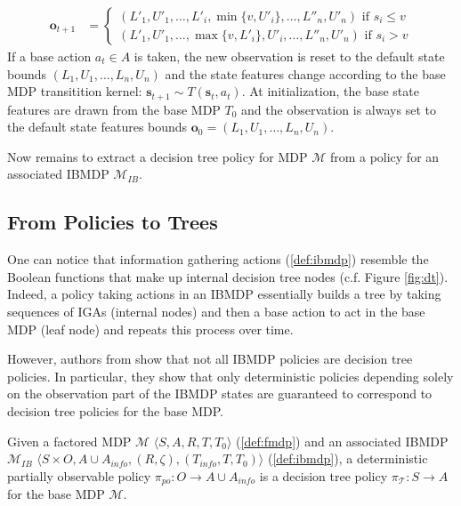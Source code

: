 \begin{definition}
\begin{itemize}
\begin{align*}
    \boldsymbol{o}_{t+1} &= \begin{cases}
        (L'_1, U'_1, \dots , L'_i, \min\{v, U'_i\}, \dots , L''_n, U'_n) \text{ if } s_i \leq v\\
        (L'_1, U'_1, \dots , \max\{v, L'_i\}, U'_i, \dots , L''_n, U'_n) \text{ if } s_i > v
    \end{cases}
\end{align*}
If a base action $a_t\in A$ is taken, the new observation is reset to the default state bounds $(L_1, U_1,\dots, L_n, U_n)$ and the state features change according to the base MDP transitition kernel: $\boldsymbol{s}_{t+1}\sim T(\boldsymbol{s}_t, a_t)$.
At initialization, the base state features are drawn from the base MDP $T_0$ and the observation is always set to the default state features bounds $\boldsymbol{o}_0=(L_1, U_1,\dots, L_n, U_n)$.
\end{itemize}
\end{definition}

Now remains to extract a decision tree policy for MDP $\mathcal{M}$ from a policy for an associated IBMDP $\mathcal{M}_{IB}$. 

\subsection{From Policies to Trees}

One can notice that information gathering actions (\ref{def:ibmdp}) resemble the Boolean functions that make up internal decision tree nodes (c.f. Figure \ref{fig:dt}).
Indeed, a policy taking actions in an IBMDP essentially builds a tree by taking sequences of IGAs (internal nodes) and then a base action to act in the base MDP (leaf node) and repeats this process over time.

However, authors from \cite{topin2021iterative} show that not all IBMDP policies are decision tree policies.
In particular, they show that only deterministic policies depending solely on the observation part of the IBMDP states are guaranteed to correspond to decision tree policies for the base MDP.

\begin{proposition}\label{def:po-policy}
    Given a factored MDP $\mathcal{M}$ $\langle S, A, R, T, T_0\rangle$ (\ref{def:fmdp}) and an associated IBMDP $\mathcal{M}_{IB}$ $\langle S \times O,A \cup A_{info}, (R, \zeta), (T_{info}, T, T_0)\rangle$ (\ref{def:ibmdp}), a deterministic partially observable policy $\pi_{po}: O \rightarrow A\cup A_{info}$ is a decision tree policy $\pi_{\mathcal{T}}: S \rightarrow A$ for the base MDP $\mathcal{M}$.
\end{proposition}

